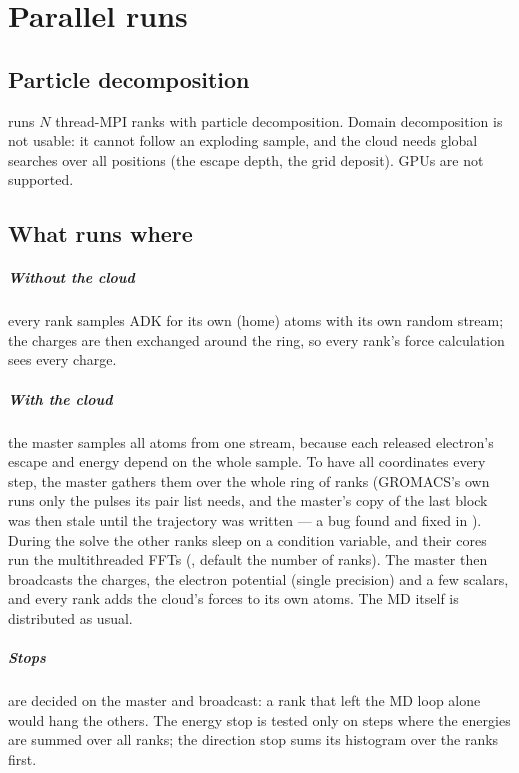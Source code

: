 \chapter{Parallel runs}
\label{app:parallel}

\section{Particle decomposition}

 runs $N$ thread-MPI ranks with particle decomposition.
Domain decomposition is not usable: it cannot follow an exploding sample, and the cloud needs global searches over
all positions (the escape depth, the grid deposit).
GPUs are not supported.

\section{What runs where}

\paragraph{Without the cloud} every rank samples ADK for its own (home) atoms with its own random stream; the charges
are then exchanged around the ring, so every rank's force calculation sees every charge.
\paragraph{With the cloud} the master samples all atoms from one stream, because each released electron's escape and
energy depend on the whole sample.
To have all coordinates every step, the master gathers them over the whole ring of ranks (GROMACS's own
 runs only the pulses its pair list needs, and the master's copy of the last block was then stale until
the trajectory was written --- a bug found and fixed in ).
During the solve the other ranks sleep on a condition variable, and their cores run the multithreaded FFTs
(, default the number of ranks).
The master then broadcasts the charges, the electron potential (single precision) and a few scalars, and every rank adds
the cloud's forces to its own atoms.
The MD itself is distributed as usual.

\paragraph{Stops} are decided on the master and broadcast: a rank that left the MD loop alone would hang the others.
The energy stop is tested only on steps where the energies are summed over all ranks; the direction stop sums its
histogram over the ranks first.

